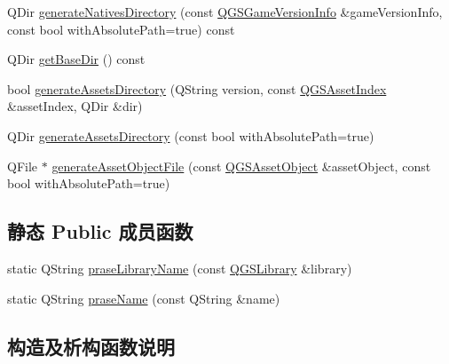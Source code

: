 \begin{DoxyCompactItemize}
\item 
Q\+Dir \mbox{\hyperlink{class_q_g_s_game_directory_ac1d8970969a67c381419d82c2a417005}{generate\+Natives\+Directory}} (const \mbox{\hyperlink{class_q_g_s_game_version_info}{Q\+G\+S\+Game\+Version\+Info}} \&game\+Version\+Info, const bool with\+Absolute\+Path=true) const
\item 
Q\+Dir \mbox{\hyperlink{class_q_g_s_game_directory_a21dd5c0148e53b411fb34454e420c3b2}{get\+Base\+Dir}} () const
\item 
bool \mbox{\hyperlink{class_q_g_s_game_directory_a3555a3afd10b0e12e5999de3ee33db9d}{generate\+Assets\+Directory}} (Q\+String version, const \mbox{\hyperlink{class_q_g_s_asset_index}{Q\+G\+S\+Asset\+Index}} \&asset\+Index, Q\+Dir \&dir)
\item 
Q\+Dir \mbox{\hyperlink{class_q_g_s_game_directory_a7a7937b016d23546139159e3e46c595b}{generate\+Assets\+Directory}} (const bool with\+Absolute\+Path=true)
\item 
Q\+File $\ast$ \mbox{\hyperlink{class_q_g_s_game_directory_ad26a645aa34d8bf76399c49d80aa2d75}{generate\+Asset\+Object\+File}} (const \mbox{\hyperlink{class_q_g_s_asset_object}{Q\+G\+S\+Asset\+Object}} \&asset\+Object, const bool with\+Absolute\+Path=true)
\end{DoxyCompactItemize}
\subsection*{静态 Public 成员函数}
\begin{DoxyCompactItemize}
\item 
static Q\+String \mbox{\hyperlink{class_q_g_s_game_directory_a862cadde0ec810cb444346fcf2f75da4}{prase\+Library\+Name}} (const \mbox{\hyperlink{class_q_g_s_library}{Q\+G\+S\+Library}} \&library)
\item 
static Q\+String \mbox{\hyperlink{class_q_g_s_game_directory_a05d4f173c565e05d9f271a31ea6a82e6}{prase\+Name}} (const Q\+String \&name)
\end{DoxyCompactItemize}


\subsection{构造及析构函数说明}
\mbox{\label{class_q_g_s_game_directory_a3bdb7ff5edb5e460f425cffb499fc25b}} 
